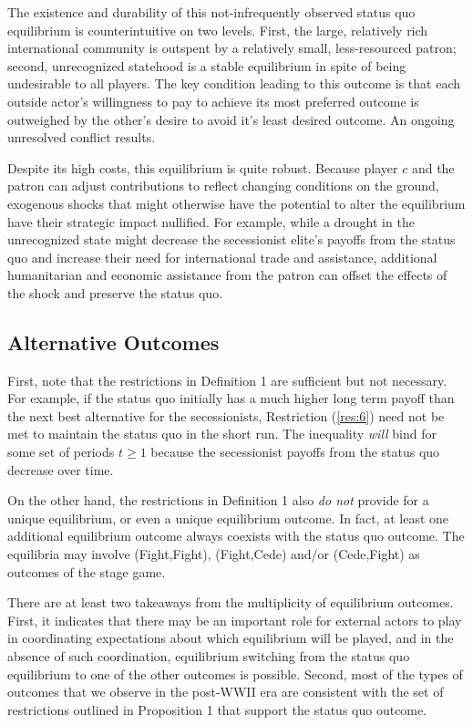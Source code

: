 The existence and durability of this not-infrequently observed status quo equilibrium is counterintuitive on two levels. First, the large, relatively rich international community is outspent by a relatively small, less-resourced patron; second, unrecognized statehood is a stable equilibrium in spite of being undesirable to all players. The key condition leading to this outcome is that each outside actor's willingness to pay to achieve its most preferred outcome is outweighed by the other's desire to avoid it's least desired outcome. An ongoing unresolved conflict results.

Despite its high costs, this equilibrium is quite robust. Because player $c$ and the patron can adjust contributions to reflect changing conditions on the ground, exogenous shocks that might otherwise have the potential to alter the equilibrium have their strategic impact nullified. For example, while a drought in the unrecognized state might decrease the secessionist elite's payoffs from the status quo and increase their need for international trade and assistance, additional humanitarian and economic assistance from the patron can offset the effects of the shock and preserve the status quo.

\subsection{Alternative Outcomes}
\label{sec:alt}

First, note that the restrictions in Definition 1 are sufficient but not necessary. For example, if the status quo initially has a much higher long term payoff than the next best alternative for the secessionists, Restriction (\ref{res:6}) need not be met to maintain the status quo in the short run. The inequality \emph{will} bind for some set of periods $t \geq 1$ because the secessionist payoffs from the status quo decrease over time. 

On the other hand, the restrictions in Definition 1 also \emph{do not} provide for a unique equilibrium, or even a unique equilibrium outcome. In fact, at least one additional equilibrium outcome always coexists with the status quo outcome. The equilibria may involve (Fight,Fight), (Fight,Cede) and/or (Cede,Fight) as outcomes of the stage game.

There are at least two takeaways from the multiplicity of equilibrium outcomes. First, it indicates that there may be an important role for external actors to play in coordinating expectations about which equilibrium will be played, and in the absence of such coordination, equilibrium switching from the status quo equilibrium to one of the other outcomes is possible. Second, most of the types of outcomes that we observe in the post-WWII era are consistent with the set of restrictions outlined in Proposition 1 that support the status quo outcome. 

